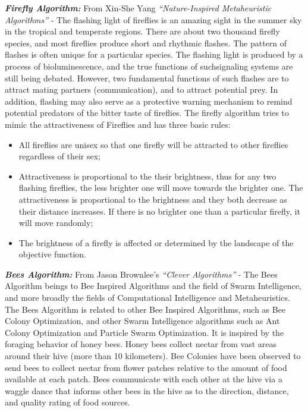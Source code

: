 \documentclass[conference]{IEEEtran}
\begin{document}
\textit{\textbf{Firefly Algorithm:}} From Xin-She Yang \textit{``Nature-Inspired Metaheuristic Algorithms''} -
The flashing light of fireflies is an amazing sight in the summer sky in the tropical and temperate regions. There are about two thousand firefly
species, and most fireflies produce short and rhythmic flashes. The pattern of flashes is often unique for a particular species. The flashing light is
produced by a process of bioluminescence, and the true functions of suchsignaling systems are still being debated. However, two fundamental functions
of such flashes are to attract mating partners (communication), and to attract potential prey. In addition, flashing may also serve as a protective warning
mechanism to remind potential predators of the bitter taste of fireflies. The firefly algorithm tries to mimic the attractiveness of Fireflies and has three
basic rules:

\begin{itemize}
    \item All fireflies are unisex so that one firefly will be attracted to other
          fireflies regardless of their sex;
    \item Attractiveness is proportional to the their brightness, thus for any two
          flashing fireflies, the less brighter one will move towards the brighter
          one. The attractiveness is proportional to the brightness and they
          both decrease as their distance increases. If there is no brighter one
          than a particular firefly, it will move randomly;
    \item The brightness of a firefly is affected or determined by the landscape
          of the objective function.
\end{itemize}


\textit{\textbf{Bees Algorithm:}} From Jason Brownlee's \textit{``Clever Algorithms''} -
The Bees Algorithm beings to Bee Inspired Algorithms and the field of Swarm Intelligence, and more broadly the fields of Computational
Intelligence and Metaheuristics. The Bees Algorithm is related to other Bee Inspired Algorithms, such as Bee Colony Optimization, and other
Swarm Intelligence algorithms such as Ant Colony Optimization and Particle Swarm Optimization.
It is inspired by the foraging behavior of honey bees. Honey bees collect nectar from vast areas around their hive (more than
10 kilometers). Bee Colonies have been observed to send bees to collect nectar from flower patches relative to the amount of food available at
each patch. Bees communicate with each other at the hive via a waggle dance that informs other bees in the hive as to the direction, distance,
and quality rating of food sources.
\end{document}
